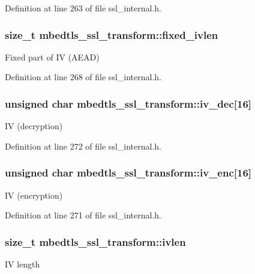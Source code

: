 Definition at line 263 of file ssl\-\_\-internal.\-h.

\hypertarget{structmbedtls__ssl__transform_aeb9dc8aee94effb34d725e259e390c2d}{
\subsubsection[{fixed\-\_\-ivlen}]{\setlength{\rightskip}{0pt plus 5cm}size\-\_\-t mbedtls\-\_\-ssl\-\_\-transform\-::fixed\-\_\-ivlen}}\label{structmbedtls__ssl__transform_aeb9dc8aee94effb34d725e259e390c2d}
Fixed part of I\-V (A\-E\-A\-D) 

Definition at line 268 of file ssl\-\_\-internal.\-h.

\hypertarget{structmbedtls__ssl__transform_ad31f126ea147ffa513cc4ad170d2ff25}{
\subsubsection[{iv\-\_\-dec}]{\setlength{\rightskip}{0pt plus 5cm}unsigned char mbedtls\-\_\-ssl\-\_\-transform\-::iv\-\_\-dec\mbox{[}16\mbox{]}}}\label{structmbedtls__ssl__transform_ad31f126ea147ffa513cc4ad170d2ff25}
I\-V (decryption) 

Definition at line 272 of file ssl\-\_\-internal.\-h.

\hypertarget{structmbedtls__ssl__transform_a5dc42f2d1f720d396c35eb355cba69e2}{
\subsubsection[{iv\-\_\-enc}]{\setlength{\rightskip}{0pt plus 5cm}unsigned char mbedtls\-\_\-ssl\-\_\-transform\-::iv\-\_\-enc\mbox{[}16\mbox{]}}}\label{structmbedtls__ssl__transform_a5dc42f2d1f720d396c35eb355cba69e2}
I\-V (encryption) 

Definition at line 271 of file ssl\-\_\-internal.\-h.

\hypertarget{structmbedtls__ssl__transform_aabfe6c0fea0a8bcaa89823c2f06d885a}{
\subsubsection[{ivlen}]{\setlength{\rightskip}{0pt plus 5cm}size\-\_\-t mbedtls\-\_\-ssl\-\_\-transform\-::ivlen}}\label{structmbedtls__ssl__transform_aabfe6c0fea0a8bcaa89823c2f06d885a}
I\-V length 


